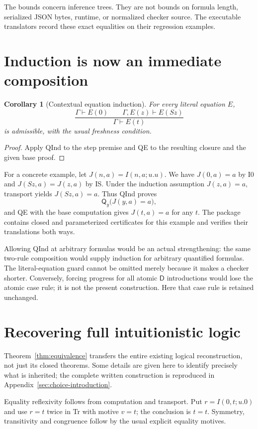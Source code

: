 \documentclass[11pt,letterpaper]{article}
\newtheorem{corollary}[theorem]{Corollary}
\theoremstyle{definition}\newtheorem{definition}[theorem]{Definition}
\theoremstyle{remark}\newtheorem{remark}[theorem]{Remark}
\newcommand{\D}{\mathsf D}
\newcommand{\Q}{\mathsf Q}
\begin{document}
The bounds concern inference trees. They are not bounds on formula
length, serialized JSON bytes, runtime, or normalized checker source.
The executable translators record these exact equalities on their
regression examples.

\section{Induction is now an immediate composition}

\begin{corollary}[Contextual equation induction]
For every literal equation $E$,
\[
 \frac{\Gamma\vdash E(0)\qquad\Gamma,E(z)\vdash E(Sz)}
      {\Gamma\vdash E(t)}
\]
is admissible, with the usual freshness condition.
\end{corollary}
\begin{proof}
Apply QInd to the step premise and QE to the resulting closure and
the given base proof.
\end{proof}

For a concrete example, let $J(n,a)=I(n,a;u.u)$. We have
$J(0,a)=a$ by I0 and $J(Sz,a)=J(z,a)$ by IS. Under the induction
assumption $J(z,a)=a$, transport yields $J(Sz,a)=a$. Thus QInd proves
\[
                 \Q_y\bigl(J(y,a)=a\bigr),
\]
and QE with the base computation gives $J(t,a)=a$ for any $t$.
The package contains closed and parameterized certificates for this
example and verifies their translations both ways.

Allowing QInd at arbitrary formulas would be an actual strengthening:
the same two-rule composition would supply induction for arbitrary
quantified formulas. The literal-equation guard cannot be omitted merely
because it makes a checker shorter. Conversely, forcing progress for
all atomic $\D$ introductions would lose the atomic case rule; it is
not the present construction. Here that case rule is retained unchanged.

\section{Recovering full intuitionistic logic}

Theorem~\ref{thm:equivalence} transfers the entire existing logical
reconstruction, not just its closed theorems. Some details are given
here to identify precisely what is inherited; the complete written
construction is reproduced in Appendix~\ref{sec:choice-introduction}.

Equality reflexivity follows from computation and transport. Put
$r=I(0,t;u.0)$ and use $r=t$ twice in Tr with motive $v=t$; the
conclusion is $t=t$. Symmetry, transitivity and congruence follow by the
usual explicit equality motives.
\end{document}
